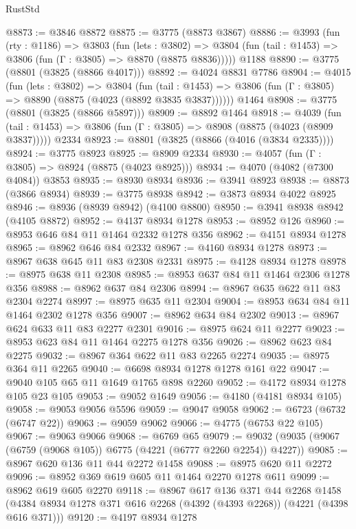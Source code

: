 \begin{lexlean}{RustStd}
\begin{coremodule}
@8873 := @3846 @8872
@8875 := @3775 (@8873 @3867)
@8886 := @3993
    (fun (rty : @1186) =>
    @3803
      (fun (lets : @3802) =>
      @3804 (fun (tail : @1453) => @3806 (fun (Γ : @3805) => @8870 (@8875 @8836)))))
    @1188
@8890 := @3775 (@8801 (@3825 (@8866 @4017)))
@8892 := @4024 @8831 @7786
@8904 := @4015
    (fun (lets : @3802) =>
    @3804
      (fun (tail : @1453) => @3806 (fun (Γ : @3805) => @8890 (@8875 (@4023 (@8892 @3835 @3837))))))
    @1464
@8908 := @3775 (@8801 (@3825 (@8866 @5897)))
@8909 := @8892 @1464
@8918 := @4039
    (fun (tail : @1453) => @3806 (fun (Γ : @3805) => @8908 (@8875 (@4023 (@8909 @3837)))))
    @2334
@8923 := @8801 (@3825 (@8866 (@4016 (@3834 @2335))))
@8924 := @3775 @8923
@8925 := @8909 @2334
@8930 := @4057 (fun (Γ : @3805) => @8924 (@8875 (@4023 @8925)))
@8934 := @4070 (@4082 (@7300 @4084)) @3853
@8935 := @8930 @8934
@8936 := @3941 @8923
@8938 := @8873 (@3866 @8934)
@8939 := @3775 @8938
@8942 := @3873 @8934 @4022 @8925
@8946 := @8936 (@8939 @8942) (@4100 @8800)
@8950 := @3941 @8938 @8942 (@4105 @8872)
@8952 := @4137 @8934 @1278
@8953 := @8952 @126
@8960 := @8953 @646 @84 @11 @1464 @2332 @1278 @356
@8962 := @4151 @8934 @1278
@8965 := @8962 @646 @84 @2332
@8967 := @4160 @8934 @1278
@8973 := @8967 @638 @645 @11 @83 @2308 @2331
@8975 := @4128 @8934 @1278
@8978 := @8975 @638 @11 @2308
@8985 := @8953 @637 @84 @11 @1464 @2306 @1278 @356
@8988 := @8962 @637 @84 @2306
@8994 := @8967 @635 @622 @11 @83 @2304 @2274
@8997 := @8975 @635 @11 @2304
@9004 := @8953 @634 @84 @11 @1464 @2302 @1278 @356
@9007 := @8962 @634 @84 @2302
@9013 := @8967 @624 @633 @11 @83 @2277 @2301
@9016 := @8975 @624 @11 @2277
@9023 := @8953 @623 @84 @11 @1464 @2275 @1278 @356
@9026 := @8962 @623 @84 @2275
@9032 := @8967 @364 @622 @11 @83 @2265 @2274
@9035 := @8975 @364 @11 @2265
@9040 := @6698 @8934 @1278 @1278 @161 @22
@9047 := @9040 @105 @65 @11 @1649 @1765 @898 @2260
@9052 := @4172 @8934 @1278 @105 @23 @105
@9053 := @9052 @1649
@9056 := @4180 (@4181 @8934 @105)
@9058 := @9053 @9056 @5596
@9059 := @9047 @9058
@9062 := @6723 (@6732 (@6747 @22))
@9063 := @9059 @9062
@9066 := @4775 (@6753 @22 @105)
@9067 := @9063 @9066
@9068 := @6769 @65
@9079 := @9032 (@9035 (@9067 (@6759 (@9068 @105)) @6775 (@4221 (@6777 @2260 @2254)) @4227))
@9085 := @8967 @620 @136 @11 @44 @2272 @1458
@9088 := @8975 @620 @11 @2272
@9096 := @8952 @369 @619 @605 @11 @1464 @2270 @1278 @611
@9099 := @8962 @619 @605 @2270
@9118 := @8967
    @617
    @136
    @371
    @44
    @2268
    @1458
    (@4384 @8934 @1278 @371 @616 @2268 (@4392 (@4393 @2268)) (@4221 (@4398 @616 @371)))
@9120 := @4197 @8934 @1278

\end{coremodule}
\end{lexlean}
